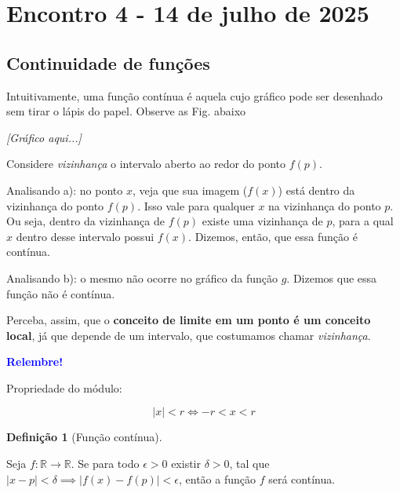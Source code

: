 \documentclass[12pt,openright,twoside,a4paper]{article}
\theoremstyle{definition}
\newtheorem{definition}{Definição}[section]
\begin{document}
	\pagebreak
	
	\section{Encontro 4 - 14 de julho de 2025}
	
	\subsection{Continuidade de funções}
	
	Intuitivamente, uma função contínua é aquela cujo gráfico pode ser desenhado sem tirar o lápis do papel. Observe as Fig. abaixo
	
	\textit{[Gráfico aqui...]}
	
	Considere \textit{vizinhança }o intervalo aberto ao redor do ponto $f(p)$. 
	
	Analisando a): no ponto $x$, veja que sua imagem ($f(x)$) está dentro da vizinhança do ponto $f(p)$. Isso vale para qualquer $x$ na vizinhança do ponto $p$. Ou seja, dentro da vizinhança de $f(p)$ existe uma vizinhança de $p$, para a qual $x$ dentro desse intervalo possui $f(x)$. Dizemos, então, que essa função é contínua.
	
	Analisando b): o mesmo não ocorre no gráfico da função $g$. Dizemos que essa função não é contínua.
	
	Perceba, assim, que o \textbf{conceito de limite em um ponto é um conceito local}, já que depende de um intervalo, que costumamos chamar \textit{vizinhança}.
	
	\begin{snugshade}
		\textbf{\textcolor{blue}{Relembre!}}
		
		Propriedade do módulo:
		
		\begin{equation*}
			|x| < r \iff -r < x < r
		\end{equation*}
	\end{snugshade}
	
	\begin{definition}[Função contínua]\label{def:continuidade}
		
		Seja $f: \mathbb{R} \longrightarrow \mathbb{R}$. Se para todo $\epsilon > 0$ existir $\delta > 0$, tal que $| x - p |  < \delta \implies |f(x) - f(p) | < \epsilon$, então a função $f$ será contínua.
	\end{definition}
	
\end{document}
